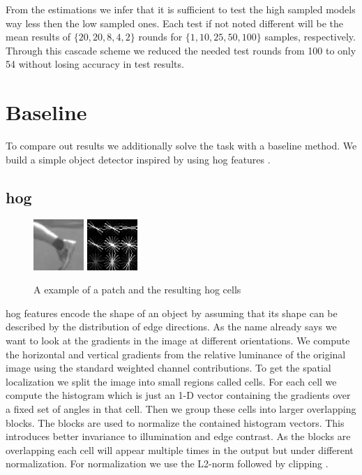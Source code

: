 From the estimations  we infer that it is sufficient to test the high sampled models way less then the low sampled ones. Each test if not noted different will be the mean results of $\{20, 20, 8, 4, 2\}$ rounds for $\{1, 10, 25, 50, 100\}$ samples, respectively. Through this cascade scheme we reduced the needed test rounds from 100 to only 54 without losing accuracy in test results.

\clearpage
\section{Baseline}
\label{sec:results:baseline}
To compare out results we additionally solve the task with a baseline method. We build a simple object detector inspired by \citet{felzenszwalb_object_2010} using \gls{hog} features \citep{dalal_histograms_2005}.\\

\subsection{\Gls{hog}}
\begin{figure}
  \vspace{-25pt}
  \begin{center}
    \includegraphics[width=0.17\textwidth]{figures/hog_image.png}
    \includegraphics[width=0.17\textwidth]{figures/hog_feature.png}
  \end{center}
  \vspace{-5pt}
  \caption{A example of a patch and  the resulting \gls{hog} cells}
  \vspace{-10pt}
  \label{fig:hog}
\end{figure}
\gls{hog} features encode the shape of an object by assuming that its shape can be described by the distribution of edge directions. As the name already says we want to look at the gradients in the image at different orientations. We compute the horizontal and vertical gradients from the relative luminance of the original image using the standard weighted channel contributions. To get the spatial localization we split the image into small regions called cells. For each cell we compute the histogram which is just an 1-D vector containing the gradients over a fixed set of angles in that cell. Then we group these cells into larger overlapping blocks. The blocks are used to normalize the contained histogram vectors. This introduces better invariance to illumination and edge contrast. As the blocks are overlapping each cell will appear multiple times in the output but under different normalization. For normalization we use the L2-norm followed by clipping \citep{lowe_distinctive_2004}.

